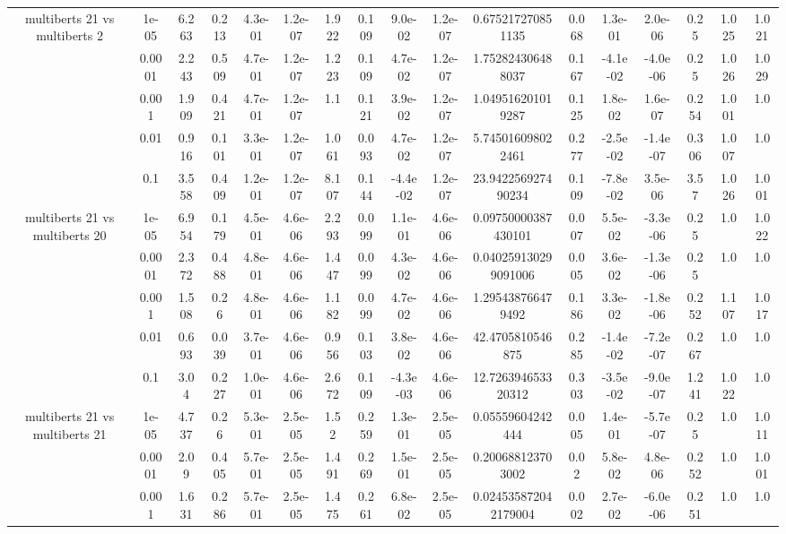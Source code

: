 \begin{tabular}{|c|c|c|c|c|c|c|c|c|c|c|c|c|c|c|c|c|}
\hline
\multirow{5}{*}{multiberts 21 vs multiberts 2} & 1e-05 & 6.263 & 0.213 & 4.3e-01 & 1.2e-07 & 1.922 & 0.109 & 9.0e-02 & 1.2e-07 & 0.675217270851135 & 0.068 & 1.3e-01 & 2.0e-06 & 0.25 & 1.025 & 1.021 \\
 & 0.0001 & 2.243 & 0.509 & 4.7e-01 & 1.2e-07 & 1.223 & 0.109 & 4.7e-02 & 1.2e-07 & 1.752824306488037 & 0.167 & -4.1e-02 & -4.0e-06 & 0.25 & 1.026 & 1.029 \\
 & 0.001 & 1.909 & 0.421 & 4.7e-01 & 1.2e-07 & 1.1 & 0.121 & 3.9e-02 & 1.2e-07 & 1.049516201019287 & 0.125 & 1.8e-02 & 1.6e-07 & 0.254 & 1.001 & 1.0 \\
 & 0.01 & 0.916 & 0.101 & 3.3e-01 & 1.2e-07 & 1.061 & 0.093 & 4.7e-02 & 1.2e-07 & 5.745016098022461 & 0.277 & -2.5e-02 & -1.4e-07 & 0.306 & 1.007 & 1.0 \\
 & 0.1 & 3.558 & 0.409 & 1.2e-01 & 1.2e-07 & 8.107 & 0.144 & -4.4e-02 & 1.2e-07 & 23.942256927490234 & 0.109 & -7.8e-02 & 3.5e-06 & 3.57 & 1.026 & 1.001 \\
\hline
\multirow{5}{*}{multiberts 21 vs multiberts 20} & 1e-05 & 6.954 & 0.179 & 4.5e-01 & 4.6e-06 & 2.293 & 0.099 & 1.1e-01 & 4.6e-06 & 0.09750000387430101 & 0.007 & 5.5e-02 & -3.3e-06 & 0.25 & 1.0 & 1.022 \\
 & 0.0001 & 2.372 & 0.488 & 4.8e-01 & 4.6e-06 & 1.447 & 0.099 & 4.3e-02 & 4.6e-06 & 0.040259130299091006 & 0.005 & 3.6e-02 & -1.3e-06 & 0.25 & 1.0 & 1.0 \\
 & 0.001 & 1.508 & 0.26 & 4.8e-01 & 4.6e-06 & 1.182 & 0.099 & 4.7e-02 & 4.6e-06 & 1.295438766479492 & 0.186 & 3.3e-02 & -1.8e-06 & 0.252 & 1.107 & 1.017 \\
 & 0.01 & 0.693 & 0.039 & 3.7e-01 & 4.6e-06 & 0.956 & 0.103 & 3.8e-02 & 4.6e-06 & 42.4705810546875 & 0.285 & -1.4e-02 & -7.2e-07 & 0.267 & 1.0 & 1.0 \\
 & 0.1 & 3.04 & 0.227 & 1.0e-01 & 4.6e-06 & 2.672 & 0.109 & -4.3e-03 & 4.6e-06 & 12.726394653320312 & 0.303 & -3.5e-02 & -9.0e-07 & 1.241 & 1.022 & 1.0 \\
\hline
\multirow{5}{*}{multiberts 21 vs multiberts 21} & 1e-05 & 4.737 & 0.26 & 5.3e-01 & 2.5e-05 & 1.52 & 0.259 & 1.3e-01 & 2.5e-05 & 0.05559604242444 & 0.005 & 1.4e-01 & -5.7e-07 & 0.25 & 1.0 & 1.011 \\
 & 0.0001 & 2.09 & 0.405 & 5.7e-01 & 2.5e-05 & 1.491 & 0.269 & 1.5e-01 & 2.5e-05 & 0.200688123703002 & 0.02 & 5.8e-02 & 4.8e-06 & 0.252 & 1.0 & 1.001 \\
 & 0.001 & 1.631 & 0.286 & 5.7e-01 & 2.5e-05 & 1.475 & 0.261 & 6.8e-02 & 2.5e-05 & 0.024535872042179004 & 0.002 & 2.7e-02 & -6.0e-06 & 0.251 & 1.0 & 1.0 \\

\end{tabular}
